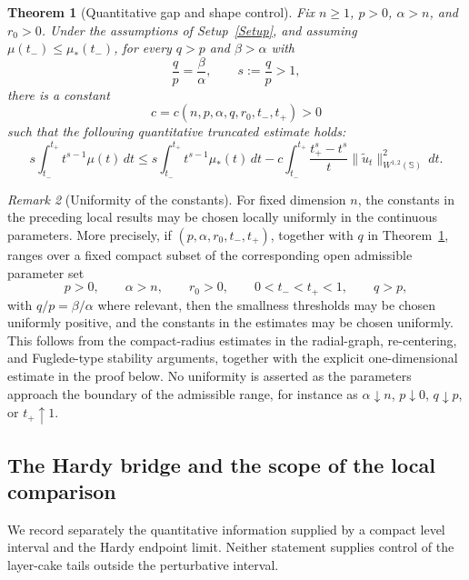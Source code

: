 \documentclass[11pt]{amsart}
\theoremstyle{plain}
\newtheorem{theorem}{Theorem}[section]
\theoremstyle{definition}
\theoremstyle{remark}
\newtheorem{remark}[theorem]{Remark}
\newcommand{\Sph}{\mathbb{S}}
\begin{document}
\begin{theorem}[Quantitative gap and shape control]\label{thm:local_gap}
Fix \(n\ge 1\), \(p>0\), \(\alpha>n\), and \(r_0>0\). Under the assumptions
of Setup~\ref{Setup}, and assuming $\mu(t_-)\le\mu_*(t_-)$, for every
\(q>p\) and \(\beta>\alpha\) with
\[
\frac{q}{p}=\frac{\beta}{\alpha},
\qquad
s:=\frac{q}{p}>1,
\]
there is a constant
\[
c=c(n,p,\alpha,q,r_0,t_-,t_+)>0
\]
such that the following quantitative truncated estimate holds:
\begin{equation}\label{eq:local_gap_new}
s\int_{t_-}^{t_+}t^{s-1}\mu(t)\,dt
\le s\int_{t_-}^{t_+}t^{s-1}\mu_*(t)\,dt
-c\int_{t_-}^{t_+}\frac{t_+^s-t^s}{t}
\|\widetilde u_t\|_{W^{1,2}(\Sph)}^2\,dt.
\end{equation}
\end{theorem}

\begin{remark}[Uniformity of the constants]\label{rem:uniform_constants}
For fixed dimension $n$, the constants in the preceding local results may be
chosen locally uniformly in the continuous parameters. More precisely, if
$(p,\alpha,r_0,t_-,t_+)$, together with $q$ in
Theorem~\ref{thm:local_gap}, ranges over a fixed compact subset of the
corresponding open admissible parameter set
\[
p>0,\qquad \alpha>n,\qquad r_0>0,\qquad
0<t_-<t_+<1,\qquad q>p,
\]
with $q/p=\beta/\alpha$ where relevant, then the smallness thresholds may be
chosen uniformly positive, and the constants in the estimates may be chosen
uniformly. This follows from the compact-radius estimates in the radial-graph,
re-centering, and Fuglede-type stability arguments, together with the explicit
one-dimensional estimate in the proof below. No uniformity is asserted as the
parameters approach the boundary of the admissible range, for instance as
$\alpha\downarrow n$, $p\downarrow0$, $q\downarrow p$, or $t_+\uparrow1$.
\end{remark}


\subsection{The Hardy bridge and the scope of the local comparison}\label{sec:endpoint_local_chain}
We record separately the quantitative information supplied by a compact level
interval and the Hardy endpoint limit. Neither statement supplies control of
the layer-cake tails outside the perturbative interval.
\end{document}
